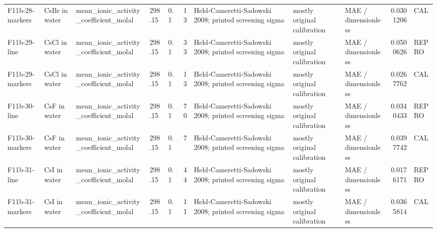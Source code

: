 \begin{landscape}
\begin{longtable}{L{1.9cm}L{2.5cm}L{2.1cm}L{1.6cm}L{1.6cm}rL{2.4cm}L{1.9cm}L{2.2cm}rL{1cm}}
F11b-\allowbreak{}28-\allowbreak{}markers & CsBr in water & mean\_\allowbreak{}ionic\_\allowbreak{}activity\_\allowbreak{}coefficient\_\allowbreak{}molal & 298.15 & 0.1 & 13 & Held-\allowbreak{}Cameretti-\allowbreak{}Sadowski 2008; printed screening sigma & mostly original calibration & MAE /\allowbreak{} dimensionless & 0.0301206 & CAL \\
F11b-\allowbreak{}29-\allowbreak{}line & CsCl in water & mean\_\allowbreak{}ionic\_\allowbreak{}activity\_\allowbreak{}coefficient\_\allowbreak{}molal & 298.15 & 0.1 & 33 & Held-\allowbreak{}Cameretti-\allowbreak{}Sadowski 2008; printed screening sigma & mostly original calibration & MAE /\allowbreak{} dimensionless & 0.0500626 & REPRO \\
F11b-\allowbreak{}29-\allowbreak{}markers & CsCl in water & mean\_\allowbreak{}ionic\_\allowbreak{}activity\_\allowbreak{}coefficient\_\allowbreak{}molal & 298.15 & 0.1 & 13 & Held-\allowbreak{}Cameretti-\allowbreak{}Sadowski 2008; printed screening sigma & mostly original calibration & MAE /\allowbreak{} dimensionless & 0.0267762 & CAL \\
F11b-\allowbreak{}30-\allowbreak{}line & CsF in water & mean\_\allowbreak{}ionic\_\allowbreak{}activity\_\allowbreak{}coefficient\_\allowbreak{}molal & 298.15 & 0.1 & 70 & Held-\allowbreak{}Cameretti-\allowbreak{}Sadowski 2008; printed screening sigma & mostly original calibration & MAE /\allowbreak{} dimensionless & 0.0340433 & REPRO \\
F11b-\allowbreak{}30-\allowbreak{}markers & CsF in water & mean\_\allowbreak{}ionic\_\allowbreak{}activity\_\allowbreak{}coefficient\_\allowbreak{}molal & 298.15 & 0.1 & 7 & Held-\allowbreak{}Cameretti-\allowbreak{}Sadowski 2008; printed screening sigma & mostly original calibration & MAE /\allowbreak{} dimensionless & 0.0397742 & CAL \\
F11b-\allowbreak{}31-\allowbreak{}line & CsI in water & mean\_\allowbreak{}ionic\_\allowbreak{}activity\_\allowbreak{}coefficient\_\allowbreak{}molal & 298.15 & 0.1 & 44 & Held-\allowbreak{}Cameretti-\allowbreak{}Sadowski 2008; printed screening sigma & mostly original calibration & MAE /\allowbreak{} dimensionless & 0.0176171 & REPRO \\
F11b-\allowbreak{}31-\allowbreak{}markers & CsI in water & mean\_\allowbreak{}ionic\_\allowbreak{}activity\_\allowbreak{}coefficient\_\allowbreak{}molal & 298.15 & 0.1 & 11 & Held-\allowbreak{}Cameretti-\allowbreak{}Sadowski 2008; printed screening sigma & mostly original calibration & MAE /\allowbreak{} dimensionless & 0.0365814 & CAL \\

\end{longtable}
\end{landscape}
